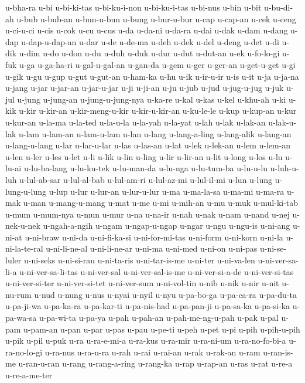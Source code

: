 {u-bha-ra u-bi u-bi-ki-tas u-bi-ku-i-non u-bi-ku-i-tas u-bi-nus u-bin u-bit
u-bu-di-ah u-bub u-bub-an u-bun-u-bun u-bung u-bur-u-bur u-cap u-cap-an
u-cek u-ceng u-ci-u-ci u-cis u-cok u-cu u-cus u-da u-da-ni u-da-ra u-dai
u-dak u-dam u-dang u-dap u-dap-u-dap-an u-dar u-de u-de-ma u-deh u-dek
u-del u-deng u-det u-di u-dik u-dim u-do u-don u-du u-duh u-duk u-dur
u-dut u-dut-an u-ek u-fo-lo-gi u-fuk u-ga u-ga-ha-ri u-gal-u-gal-an
u-gan-da u-gem u-ger u-ger-an u-get-u-get u-gi u-gik u-gu u-gup u-gut
u-gut-an u-ham-ka u-hu u-ik u-ir-u-ir u-is u-it u-ja u-ja-na u-jang u-jar
u-jar-an u-jar-u-jar u-ji u-ji-an u-ju u-jub u-jud u-jug-u-jug u-juk u-jul
u-jung u-jung-an u-jung-u-jung-nya u-ka-re u-kal u-kas u-kel u-khu-ah u-ki
u-kik u-kir u-kir-an u-kir-meng-u-kir u-kir-u-kir-an u-ku-le-le u-kup
u-kup-an u-kur u-kur-an u-la-ma u-la-ted u-la-u-la u-la-yah u-la-yat u-lah
u-lak u-lak-an u-lak-u-lak u-lam u-lam-an u-lam-u-lam u-lan u-lang
u-lang-a-ling u-lang-alik u-lang-an u-lang-u-lang u-lar u-lar-u-lar u-las
u-las-an u-lat u-lek u-lek-an u-lem u-lem-an u-len u-ler u-les u-let u-li
u-lik u-lin u-ling u-lir u-lir-an u-lit u-long u-los u-lu u-lu-ai
u-lu-ba-lang u-lu-ku-tek u-lu-man-da u-lu-nga u-lu-tum-ba u-lu-u-lu
u-luh-u-luh u-lul-ab-sar u-lul-al-bab u-lul-am-ri u-lul-az-mi u-lul-il-mi
u-lun u-lung u-lung-u-lung u-lup u-lur u-lur-an u-lur-u-lur u-ma
u-ma-la-sa u-ma-mi u-ma-ra u-mak u-man u-mang-u-mang u-mat u-me u-mi
u-mih-an u-mu u-muk u-mul-ki-tab u-mum u-mum-nya u-mun u-mur u-na u-na-ir
u-nah u-nak u-nam u-nand u-nej u-nek-u-nek u-ngah-a-ngih u-ngam
u-ngap-u-ngap u-ngar u-ngu u-ngu-is u-ni-ang u-ni-at u-ni-braw u-ni-da
u-ni-fi-ka-si u-ni-for-mi-tas u-ni-form u-ni-korn u-ni-la u-ni-la-te-ral
u-ni-li-ne-al u-ni-li-ne-ar u-ni-ma u-ni-med u-ni-on u-ni-pas
u-ni-se-luler u-ni-seks u-ni-si-rau u-ni-ta-ris u-ni-tar-is-me u-ni-ter
u-ni-va-len u-ni-ver-sa-li-a u-ni-ver-sa-li-tas u-ni-ver-sal
u-ni-ver-sal-is-me u-ni-ver-si-a-de u-ni-ver-si-tas u-ni-ver-si-ter
u-ni-ver-si-tet u-ni-ver-sum u-ni-vol-tin u-nib u-nik u-nir u-nit u-nu-rum
u-nud u-nung u-nus u-nyai u-nyil u-nyu u-pa-bo-ga u-pa-ca-ra u-pa-du-ta
u-pa-ji-wa u-pa-ka-ra u-pa-kar-ti u-pa-nis-had u-pa-pan-ji u-pa-sa-ka
u-pa-si-ka u-pa-wa-sa u-pa-wi-ta u-pa-ya u-pah u-pah-an u-pah-me-ng-u-pah
u-pak u-pal u-pam u-pam-an u-pan u-par u-pas u-pau u-pe-ti u-peh u-pet
u-pi u-pih u-pih-u-pih u-pik u-pil u-puk u-ra u-ra-e-mi-a u-ra-kus
u-ra-mir u-ra-ni-um u-ra-no-fo-bi-a u-ra-no-lo-gi u-ra-nus u-ra-u-ra u-rah
u-rai u-rai-an u-rak u-rak-an u-ram u-ran-is-me u-ran-u-ran u-rang
u-rang-a-ring u-rang-ka u-rap u-rap-an u-ras u-rat u-re-a u-re-a-me-ter
}
